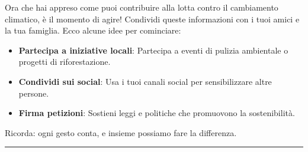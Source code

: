 \documentclass[
]{antposter}
\providecommand{\tightlist}{%
  \setlength{\itemsep}{0pt}\setlength{\parskip}{0pt}}
\begin{document}
Ora che hai appreso come puoi contribuire alla lotta contro il
cambiamento climatico, è il momento di agire! Condividi queste
informazioni con i tuoi amici e la tua famiglia. Ecco alcune idee per
cominciare:

\begin{itemize}
\tightlist
\item
  \textbf{Partecipa a iniziative locali}: Partecipa a eventi di pulizia
  ambientale o progetti di riforestazione.
\item
  \textbf{Condividi sui social}: Usa i tuoi canali social per
  sensibilizzare altre persone.
\item
  \textbf{Firma petizioni}: Sostieni leggi e politiche che promuovono la
  sostenibilità.
\end{itemize}

Ricorda: ogni gesto conta, e insieme possiamo fare la differenza.

\begin{center}\rule{0.5\linewidth}{0.5pt}\end{center}
\end{document}
